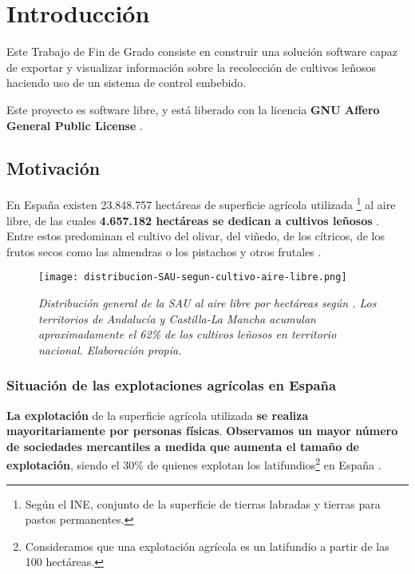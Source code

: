\chapter{Introducción}

Este Trabajo de Fin de Grado consiste en construir una solución software
capaz de exportar y visualizar información sobre la recolección de cultivos
leñosos haciendo uso de un sistema de control embebido.

Este proyecto es software libre, y está liberado con
la licencia \textbf{GNU Affero General Public License} \cite{agplv3}.

\section{Motivación}

En España existen 23.848.757 hectáreas de superficie agrícola utilizada%
\footnote{%
Según el INE, conjunto de la superficie de tierras labradas y tierras
para pastos permanentes.
}%
al aire libre, de las cuales \textbf{4.657.182 hectáreas se dedican a cultivos leñosos}
 \cite{INEdistribucionDeLaSuperficiePorTamaño}.
Entre estos predominan el cultivo del olivar, del viñedo, de los cítricos,
de los frutos secos como las almendras o los pistachos y otros frutales
 \cite{INEpanoramicaCensoAgrario}.

\begin{figure}[!b]
    \centering
    \texttt{[image: distribucion-SAU-segun-cultivo-aire-libre.png]}
    \caption{\textit{Distribución general de la SAU al aire libre por hectáreas
    según \cite{INEdistribucionDeLaSuperficiePorTamaño}. Los territorios de Andalucía y Castilla-La Mancha
    acumulan aproximadamente el 62\% de los cultivos leñosos en territorio nacional.
    Elaboración propia.}}
\end{figure}

\subsection{Situación de las explotaciones agrícolas en España}

\textbf{La explotación} de la superficie agrícola utilizada \textbf{se realiza mayoritariamente por personas
físicas}. \textbf{Observamos un mayor número de sociedades mercantiles
a medida que aumenta el tamaño de explotación}, siendo el 30\% de quienes explotan los latifundios\footnote{%
    Consideramos que una explotación agrícola es un latifundio a partir de las 100 hectáreas.
}%
 en España
 \cite[Personalidad jurídica según el tamaño de explotación]{INEpanoramicaCensoAgrario}.

